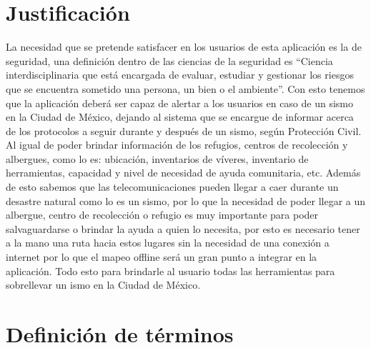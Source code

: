 \section{Justificación}
La necesidad que se pretende satisfacer en los usuarios de esta aplicación es la de seguridad, una definición dentro de las ciencias de la seguridad es “Ciencia interdisciplinaria que está encargada de evaluar, estudiar y gestionar los riesgos que se encuentra sometido una persona, un bien o el ambiente”. Con esto tenemos que la aplicación deberá ser capaz de alertar a los usuarios en caso de un sismo en la Ciudad de México, dejando al sistema que se encargue de informar acerca de los protocolos a seguir durante y después de un sismo, según Protección Civil. Al igual de poder brindar información de los refugios, centros de recolección y albergues, como lo es: ubicación, inventarios de víveres, inventario de herramientas, capacidad y nivel de necesidad de ayuda comunitaria, etc. Además de esto sabemos que las telecomunicaciones pueden llegar a caer durante un desastre natural como lo es un sismo, por lo que la necesidad de poder llegar a un albergue, centro de recolección o refugio es muy importante para poder salvaguardarse o brindar la ayuda a quien lo necesita, por esto es necesario tener a la mano una ruta hacia estos lugares sin la necesidad de una conexión a internet por lo que el mapeo offline será un gran punto a integrar en la aplicación. Todo esto para brindarle al usuario todas las herramientas para sobrellevar un ismo en la Ciudad de México. 

\section{Definición de términos}